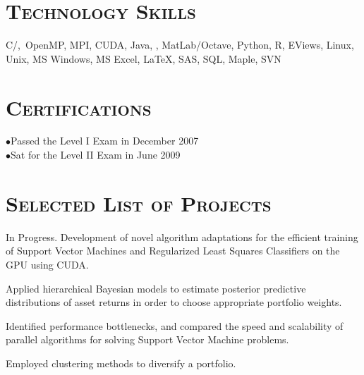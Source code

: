 \begin{resume}
\section{\textsc{Technology Skills}}
C/\Cplusplus,\ OpenMP, MPI, CUDA, Java, \CSharp, MatLab/Octave, Python, R, EViews, Linux, Unix, MS Windows, MS Excel, \LaTeX, SAS, SQL, Maple, SVN

\section{\textsc{Certifications}}
\begin{position}
$\bullet$Passed the Level I Exam in December 2007 \\
$\bullet$Sat for the Level II Exam in June 2009  
\end{position}


\section{\textsc{Selected List of Projects}}
\begin{position}
In Progress. Development of novel algorithm adaptations for the efficient training of Support Vector Machines and Regularized Least Squares Classifiers on the GPU using CUDA.
\end{position}

\begin{position}
Applied hierarchical Bayesian models to estimate posterior predictive distributions of asset returns in order to choose appropriate portfolio weights.
\end{position}

\begin{position}
Identified performance bottlenecks, and compared the speed and scalability of parallel algorithms for solving Support Vector Machine problems.
\end{position}	

\begin{position}
Employed clustering methods to diversify a portfolio.
\end{position}



\end{resume}
